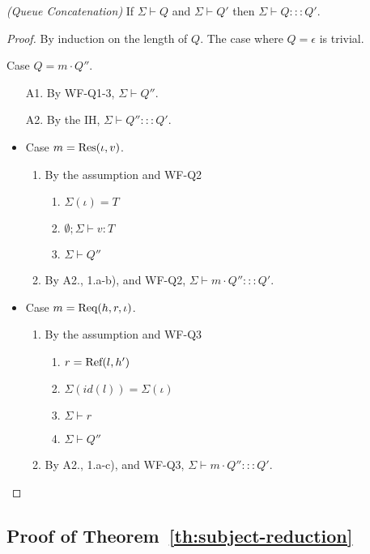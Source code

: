 \begin{lemmaun}
\emph{(Queue Concatenation)}
If $\Sigma \vdash Q$ and $\Sigma \vdash Q'$ then $\Sigma \vdash Q ::: Q'$.
\end{lemmaun}
\begin{proof}
By induction on the length of $Q$. The case where $Q = \epsilon$ is trivial.

Case $Q = m \cdot Q''$.
\begin{enumerate}
\item[A1.] By \textsc{WF-Q1-3}, $\Sigma \vdash Q''$.
\item[A2.] By the IH, $\Sigma \vdash Q'' ::: Q'$.
\end{enumerate}

\begin{itemize}
\item Case $m = {\textrm{Res}(\iota, v)}$.
\begin{enumerate}
\item By the assumption and \textsc{WF-Q2}
  \begin{enumerate}[label=(\alph*)]
  \item $\Sigma(\iota) = T$
  \item $\emptyset ; \Sigma \vdash v : T$
  \item $\Sigma \vdash Q''$
  \end{enumerate}
\item By A2., 1.a-b), and \textsc{WF-Q2}, $\Sigma \vdash m \cdot Q'' ::: Q'$.
\end{enumerate}

\item Case $m = {\textrm{Req}(h, r, \iota)}$.
\begin{enumerate}
\item By the assumption and \textsc{WF-Q3}
  \begin{enumerate}[label=(\alph*)]
  \item $r = {\textrm{Ref}(l, h')}$
  \item $\Sigma(id(l)) = \Sigma(\iota)$
  \item $\Sigma \vdash r$
  \item $\Sigma \vdash Q''$
  \end{enumerate}
\item By A2., 1.a-c), and \textsc{WF-Q3}, $\Sigma \vdash m \cdot Q'' ::: Q'$.
\end{enumerate}
\end{itemize}
\end{proof}


\subsection{Proof of Theorem~\ref{th:subject-reduction}}\label{app:subject-reduction}

